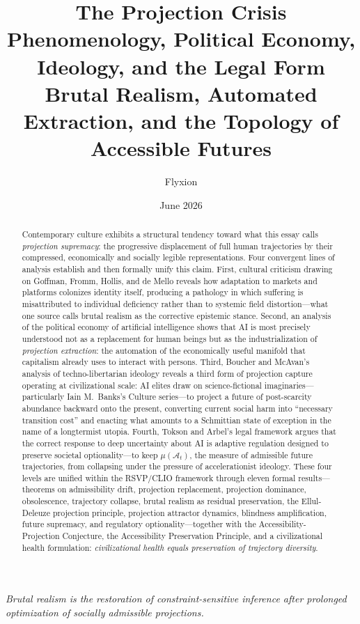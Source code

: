 \documentclass[12pt, a4paper]{article}
\title{\textbf{The Projection Crisis}\\[0.4em]
  \large Phenomenology, Political Economy, Ideology, and the Legal Form\\[0.2em]
  \normalsize Brutal Realism, Automated Extraction, and the Topology of Accessible Futures}
\author{Flyxion}
\date{June 2026}
\theoremstyle{plain}
\theoremstyle{definition}
\theoremstyle{remark}
\begin{document}
\maketitle
\thispagestyle{empty}

\epigraph{\itshape Brutal realism is the restoration of constraint-sensitive inference
  after prolonged optimization of socially admissible projections.}{}

\vspace{1.5em}

\begin{abstract}
\noindent
Contemporary culture exhibits a structural tendency toward what this essay calls
\emph{projection supremacy}: the progressive displacement of full human trajectories
by their compressed, economically and socially legible representations.
Four convergent lines of analysis establish and then formally unify this claim.
First, cultural criticism drawing on Goffman, Fromm, Hollis, and de Mello reveals
how adaptation to markets and platforms colonizes identity itself, producing a
pathology in which suffering is misattributed to individual deficiency rather than
to systemic field distortion---what one source calls brutal realism as the corrective
epistemic stance.
Second, an analysis of the political economy of artificial intelligence shows that
AI is most precisely understood not as a replacement for human beings but as the
industrialization of \emph{projection extraction}: the automation of the economically
useful manifold that capitalism already uses to interact with persons.
Third, Boucher and McAvan's analysis of techno-libertarian ideology reveals a third
form of projection capture operating at civilizational scale: AI elites draw on
science-fictional imaginaries---particularly Iain M.\ Banks's Culture series---to
project a future of post-scarcity abundance backward onto the present, converting
current social harm into ``necessary transition cost'' and enacting what amounts
to a Schmittian state of exception in the name of a longtermist utopia.
Fourth, Tokson and Arbel's legal framework argues that the correct response to
deep uncertainty about AI is adaptive regulation designed to preserve societal
optionality---to keep $\mu(\mathcal{A}_t)$, the measure of admissible future
trajectories, from collapsing under the pressure of accelerationist ideology.
These four levels are unified within the RSVP/CLIO framework through eleven formal
results---theorems on admissibility drift, projection replacement, projection dominance,
obsolescence, trajectory collapse, brutal realism as residual preservation, the
Ellul-Deleuze projection principle, projection attractor dynamics, blindness amplification,
future supremacy, and regulatory optionality---together with the Accessibility-Projection
Conjecture, the Accessibility Preservation Principle, and a civilizational health
formulation: \emph{civilizational health equals preservation of trajectory diversity}.
\end{abstract}
\end{document}
